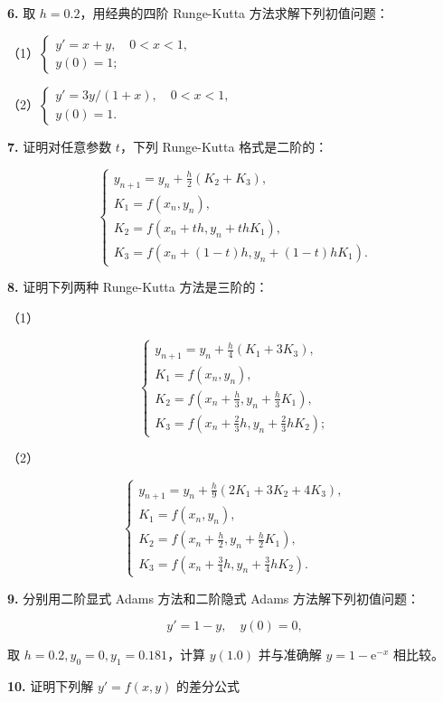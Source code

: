 \textbf{6.} 取 \(h=0.2\)，用经典的四阶 Runge-Kutta 方法求解下列初值问题：

（1）\(\begin{cases}y'=x+y,\quad0<x<1,\\y(0)=1;\end{cases}\)

（2）\(\begin{cases}y'=3y/(1+x),\quad0<x<1,\\y(0)=1.\end{cases}\)

\textbf{7.} 证明对任意参数 \(t\)，下列 Runge-Kutta 格式是二阶的：

\[
\begin{cases}
\displaystyle y_{n+1}=y_n+\frac h2(K_2+K_3),\\[6pt]
K_1=f(x_n,y_n),\\
K_2=f(x_n+th,y_n+thK_1),\\
K_3=f(x_n+(1-t)h,y_n+(1-t)hK_1).
\end{cases}
\]

\textbf{8.} 证明下列两种 Runge-Kutta 方法是三阶的：

（1）

\[
\begin{cases}
\displaystyle y_{n+1}=y_n+\frac h4(K_1+3K_3),\\[6pt]
K_1=f(x_n,y_n),\\
\displaystyle K_2=f\left(x_n+\frac h3,y_n+\frac h3K_1\right),\\[4pt]
\displaystyle K_3=f\left(x_n+\frac23h,y_n+\frac23hK_2\right);
\end{cases}
\]

（2）

\[
\begin{cases}
\displaystyle y_{n+1}=y_n+\frac h9(2K_1+3K_2+4K_3),\\[6pt]
K_1=f(x_n,y_n),\\
\displaystyle K_2=f\left(x_n+\frac h2,y_n+\frac h2K_1\right),\\[4pt]
\displaystyle K_3=f\left(x_n+\frac34h,y_n+\frac34hK_2\right).
\end{cases}
\]

\textbf{9.} 分别用二阶显式 Adams 方法和二阶隐式 Adams 方法解下列初值问题：

\[
y'=1-y,\quad y(0)=0,
\]

取 \(h=0.2,y_0=0,y_1=0.181\)，计算 \(y(1.0)\) 并与准确解 \(y=1-\mathrm e^{-x}\) 相比较。

\textbf{10.} 证明下列解 \(y'=f(x,y)\) 的差分公式

